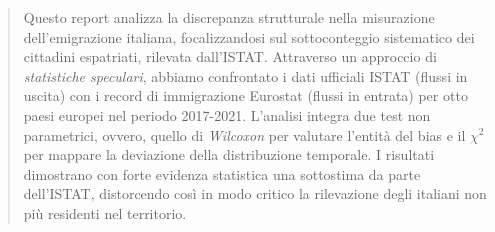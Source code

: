 \begin{abstract}
    Questo report analizza la discrepanza strutturale nella misurazione dell'emigrazione italiana, focalizzandosi sul sottoconteggio sistematico dei cittadini espatriati, rilevata dall'ISTAT.
    Attraverso un approccio di \textit{statistiche speculari}, abbiamo confrontato i dati ufficiali ISTAT (flussi in uscita) con i record di immigrazione Eurostat (flussi in entrata) per otto paesi europei nel periodo 2017-2021.
    L'analisi integra due test non parametrici, ovvero, quello di \textit{Wilcoxon} per valutare l'entità del bias e il $\chi^2$ per mappare la deviazione della distribuzione temporale.
    I risultati dimostrano con forte evidenza statistica una sottostima da parte dell'ISTAT, distorcendo così in modo critico la rilevazione degli italiani non più residenti nel territorio.
\end{abstract}